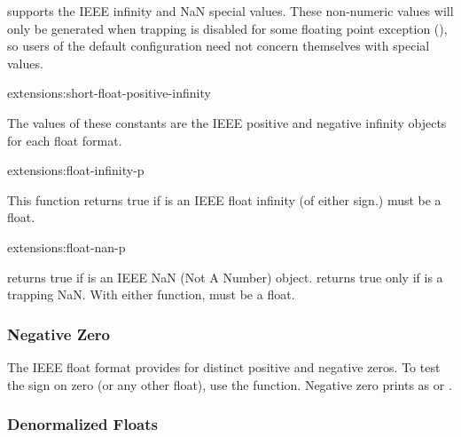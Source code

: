 \cmucl{} supports the IEEE infinity and NaN special values.  These
non-numeric values will only be generated when trapping is disabled
for some floating point exception (), so users of
the default configuration need not concern themselves with special
values.

\begin{defconst}{extensions:}{short-float-positive-infinity}
  
  The values of these constants are the IEEE positive and negative
  infinity objects for each float format.
\end{defconst}

\begin{defun}{extensions:}{float-infinity-p}{}
  
  This function returns true if  is an IEEE float infinity (of
  either sign.)   must be a float.
\end{defun}

\begin{defun}{extensions:}{float-nan-p}{}
  
   returns true if  is an IEEE NaN (Not A
  Number) object.   returns true only if
   is a trapping NaN.  With either function,  must be a
  float.
\end{defun}

\subsubsection{Negative Zero}

The IEEE float format provides for distinct positive and negative
zeros.  To test the sign on zero (or any other float), use the
\clisp{}  function.  Negative zero prints as
 or .

\subsubsection{Denormalized Floats}

